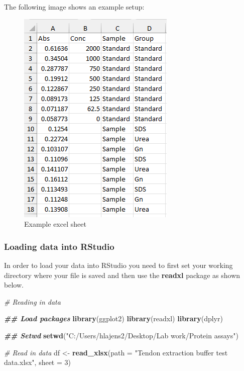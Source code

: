 \documentclass[
]{article}
\newenvironment{Shaded}{\begin{snugshade}}{\end{snugshade}}
\newcommand{\AttributeTok}[1]{\textcolor[rgb]{0.13,0.29,0.53}{#1}}
\newcommand{\CommentTok}[1]{\textcolor[rgb]{0.56,0.35,0.01}{\textit{#1}}}
\newcommand{\DecValTok}[1]{\textcolor[rgb]{0.00,0.00,0.81}{#1}}
\newcommand{\DocumentationTok}[1]{\textcolor[rgb]{0.56,0.35,0.01}{\textbf{\textit{#1}}}}
\newcommand{\FunctionTok}[1]{\textcolor[rgb]{0.13,0.29,0.53}{\textbf{#1}}}
\newcommand{\NormalTok}[1]{#1}
\newcommand{\OtherTok}[1]{\textcolor[rgb]{0.56,0.35,0.01}{#1}}
\newcommand{\StringTok}[1]{\textcolor[rgb]{0.31,0.60,0.02}{#1}}
\begin{document}
The following image shows an example setup:

\begin{figure}
\centering
\includegraphics{../Images/exampleexcel.PNG}
\caption{Example excel sheet}
\end{figure}

\pagebreak

\subsubsection{Loading data into
RStudio}\label{loading-data-into-rstudio}

In order to load your data into RStudio you need to first set your
working directory where your file is saved and then use the
\textbf{readxl} package as shown below.

\begin{Shaded}
\begin{Highlighting}[]
\CommentTok{\# Reading in data}

\DocumentationTok{\#\# Load packages}
\FunctionTok{library}\NormalTok{(ggplot2)}
\FunctionTok{library}\NormalTok{(readxl)}
\FunctionTok{library}\NormalTok{(dplyr)}

\DocumentationTok{\#\# Setwd}
\FunctionTok{setwd}\NormalTok{(}\StringTok{"C:/Users/hlajens2/Desktop/Lab work/Protein assays"}\NormalTok{)}

\CommentTok{\# Read in data }
\NormalTok{df }\OtherTok{\textless{}{-}} \FunctionTok{read\_xlsx}\NormalTok{(}\AttributeTok{path =} \StringTok{"Tendon extraction buffer test data.xlsx"}\NormalTok{, }\AttributeTok{sheet =} \DecValTok{3}\NormalTok{) }
\end{Highlighting}
\end{Shaded}
\end{document}
